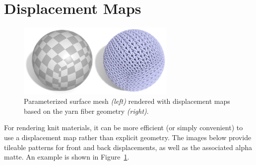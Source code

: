 \documentclass{article}
\begin{document}



\clearpage

\appendix

\section{Displacement Maps}
\label{app:DisplacementMaps}

\begin{figure}[h!]
   \centering
   \includegraphics[width=3in]{images/yarn-displacement-example.jpg}
   \caption{Parameterized surface mesh \emph{(left)} rendered with displacement maps based on the yarn fiber geometry \emph{(right)}.\label{fig:yarn-displacement-example}}
\end{figure}

For rendering knit materials, it can be more efficient (or simply convenient) to use a displacement map rather than explicit geometry.  The images below provide tileable patterns for front and back displacements, as well as the associated alpha matte.  An example is shown in Figure~\ref{fig:yarn-displacement-example}.
\end{document}
